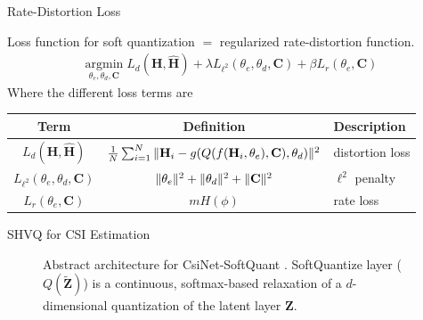 \documentclass{beamer}
\begin{document}
  \begin{frame}{Rate-Distortion Loss}
    \footnotesize{
    Loss function for soft quantization $=$ regularized rate-distortion function.
    \begin{align}
      \underset{\theta_e, \theta_d, \mathbf C}{\text{argmin}}\; L_{d}(\mathbf H, \hat {\mathbf H}) + \lambda L_{\ell^2}(\theta_e, \theta_d, \mathbf C) + \beta L_{r}(\theta_e,\mathbf C)
    \end{align} 
    Where the different loss terms are

      \begin{table}[]
      \centering
      \begin{tabular}{c|c|l}
      \toprule
      \textbf{Term} & \textbf{Definition} & \textbf{Description} \\ \midrule
       $ L_{d}(\mathbf H, \hat {\mathbf H}) $ & $ \frac 1N \sum_{i=1}^N\Arrowvert \mathbf H_i - g(Q(f(\mathbf H_i, \theta_e), \mathbf C), \theta_d) \Arrowvert^2 $ & distortion loss \\ \hline
       $ L_{\ell^2}(\theta_e, \theta_d, \mathbf C) $ & $ \Arrowvert\theta_e\Arrowvert^2+\Arrowvert\theta_d\Arrowvert^2+\Arrowvert \mathbf C \Arrowvert^2 $ & $\ell^2$ penalty \\ \hline
       $ L_{r}(\theta_e, \mathbf C) $ & $m H(\phi)$  & rate loss \\ \bottomrule
      \end{tabular}
      \end{table}
    }
  \end{frame}

  \begin{frame}{SHVQ for CSI Estimation}
    \begin{figure}[!hbtp]
    \centering
    {
      \fontsize{6pt}{8pt}
      \def\svgwidth{0.8\columnwidth}
      
    }
    \caption{Abstract architecture for CsiNet-SoftQuant \cite{ref:Yang2019DeepCMC}. SoftQuantize layer ($Q(\tilde{\mathbf Z})$) is a continuous, softmax-based relaxation of a $d$-dimensional quantization of the latent layer $\mathbf Z$.}
    \label{fig:csinet_quant}
    \end{figure}
  \end{frame}

\end{document}
